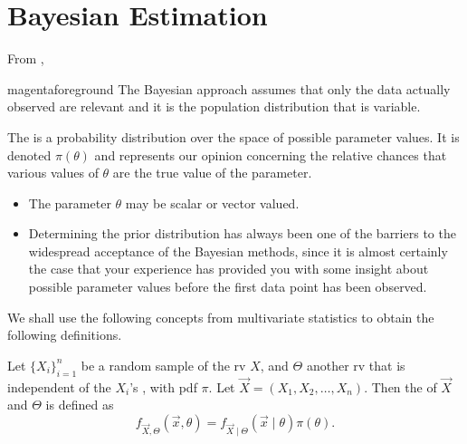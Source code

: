 \documentclass[notoc,notitlepage]{tufte-book}
\begin{document}

\section{Bayesian Estimation}%
\label{sec:bayesian_estimation}

From \citealt{klugman2012},
\begin{quotebox}{magenta}{foreground}
  The Bayesian approach assumes that only the data actually observed are
  relevant and it is the population distribution that is variable.
\end{quotebox}

\begin{defn}\label{defn:prior_distribution}
  The  is a probability distribution over the space
  of possible parameter values. It is denoted $\pi(\theta)$ and represents our
  opinion concerning the relative chances that various values of $\theta$ are
  the true value of the parameter.
\end{defn}

\begin{note}
  \begin{itemize}
    \item The parameter $\theta$ may be scalar or vector valued.
    \item Determining the prior distribution has always been one of the barriers
      to the widespread acceptance of the Bayesian methods, since it is almost
      certainly the case that your experience has provided you with some
      insight about possible parameter values before the first data point has
      been observed.
  \end{itemize}
\end{note}

We shall use the following concepts from multivariate statistics to obtain the
following definitions.

\begin{defn}\label{defn:joint_distribution}
  Let $\{ X_i \}_{i=1}^{n}$ be a random sample of the rv $X$, and $\Theta$ 
  another rv that is independent of the $X_i$'s , with pdf $\pi$. Let
  $\vec{X} = (X_1, X_2, \ldots, X_n)$. Then the  of
  $\vec{X}$ and $\Theta$ is defined as
  \begin{equation*}
    f_{\vec{X}, \Theta}(\vec{x}, \theta) = f_{\vec{X} \mid \Theta}(\vec{x} \mid
    \theta) \pi(\theta).
  \end{equation*}
\end{defn}
\end{document}
